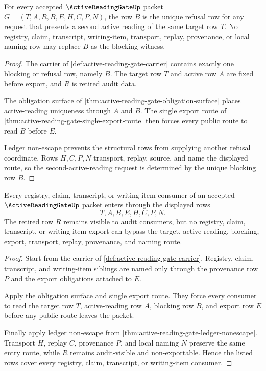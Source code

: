 \begin{theorem}
\label{thm:active-reading-gate-blocking-row-determinacy}
For every accepted $\ActiveReadingGateUp$ packet $G=(T,A,R,B,E,H,C,P,N)$, the row $B$ is the unique refusal row for any request that presents a second active reading of the same target row $T$. No registry, claim, transcript, writing-item, transport, replay, provenance, or local naming row may replace $B$ as the blocking witness.
\end{theorem}
\begin{proof}
The carrier of \autoref{def:active-reading-gate-carrier} contains exactly one blocking or refusal row, namely $B$. The target row $T$ and active row $A$ are fixed before export, and $R$ is retired audit data.

The obligation surface of \autoref{thm:active-reading-gate-obligation-surface} places active-reading uniqueness through $A$ and $B$. The single export route of \autoref{thm:active-reading-gate-single-export-route} then forces every public route to read $B$ before $E$.

Ledger non-escape prevents the structural rows from supplying another refusal coordinate. Rows $H,C,P,N$ transport, replay, source, and name the displayed route, so the second-active-reading request is determined by the unique blocking row $B$.
\end{proof}

\begin{theorem}
\label{thm:active-reading-gate-registry-consumer-coverage}
Every registry, claim, transcript, or writing-item consumer of an accepted $\ActiveReadingGateUp$ packet enters through the displayed rows
$$
T,A,B,E,H,C,P,N.
$$
The retired row $R$ remains visible to audit consumers, but no registry, claim, transcript, or writing-item export can bypass the target, active-reading, blocking, export, transport, replay, provenance, and naming route.
\end{theorem}
\begin{proof}
Start from the carrier of \autoref{def:active-reading-gate-carrier}. Registry, claim, transcript, and writing-item siblings are named only through the provenance row $P$ and the export obligations attached to $E$.

Apply the obligation surface and single export route. They force every consumer to read the target row $T$, active-reading row $A$, blocking row $B$, and export row $E$ before any public route leaves the packet.

Finally apply ledger non-escape from \autoref{thm:active-reading-gate-ledger-nonescape}. Transport $H$, replay $C$, provenance $P$, and local naming $N$ preserve the same entry route, while $R$ remains audit-visible and non-exportable. Hence the listed rows cover every registry, claim, transcript, or writing-item consumer.
\end{proof}


